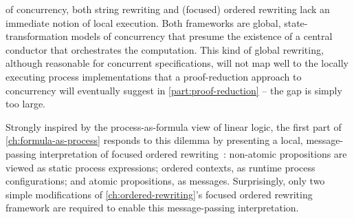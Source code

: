 


 of concurrency, both string rewriting and (focused) ordered rewriting lack an immediate notion of local execution.
Both frameworks are global, state-transformation models of concurrency that presume the existence of a central conductor that orchestrates the computation.
This kind of global rewriting, although reasonable for concurrent specifications, will not map well to the locally executing process implementations that a proof-reduction approach to concurrency will eventually suggest in \cref{part:proof-reduction} -- the gap is simply too large.

Strongly inspired by the process-as-formula view of linear logic\autocites{Miller:ELP92}{Cervesato+Scedrov:IC09}, the first part of \cref{ch:formula-as-process} responds to this dilemma by presenting a local, message-passing interpretation of focused ordered rewriting~:
non-atomic propositions are viewed as static process expressions; ordered contexts, as runtime process configurations; and atomic propositions, as messages.
Surprisingly, only two simple modifications of \cref{ch:ordered-rewriting}'s focused ordered rewriting framework are required to enable this message-passing interpretation.

